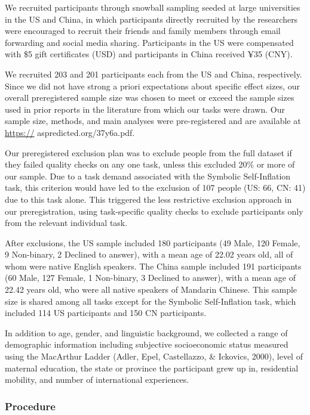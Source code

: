 \documentclass[
  man,floatsintext]{apa6}
\begin{document}
We recruited participants through snowball sampling seeded at large universities in the US and China, in which participants directly recruited by the researchers were encouraged to recruit their friends and family members through email forwarding and social media sharing. Participants in the US were compensated with \$5 gift certificates (USD) and participants in China received ¥35 (CNY).

We recruited 203 and 201 participants each from the US and China, respectively. Since we did not have strong a priori expectations about specific effect sizes, our overall preregistered sample size was chosen to meet or exceed the sample sizes used in prior reports in the literature from which our tasks were drawn. Our sample size, methods, and main analyses were pre-registered and are available at \url{https://} aspredicted.org/37y6a.pdf.

Our preregistered exclusion plan was to exclude people from the full dataset if they failed quality checks on any one task, unless this excluded 20\% or more of our sample. Due to a task demand associated with the Symbolic Self-Inflation task, this criterion would have led to the exclusion of 107 people (US: 66, CN: 41) due to this task alone. This triggered the less restrictive exclusion approach in our preregistration, using task-specific quality checks to exclude participants only from the relevant individual task.

After exclusions, the US sample included 180 participants (49 Male, 120 Female, 9 Non-binary, 2 Declined to answer), with a mean age of 22.02 years old, all of whom were native English speakers. The China sample included 191 participants (60 Male, 127 Female, 1 Non-binary, 3 Declined to answer), with a mean age of 22.42 years old, who were all native speakers of Mandarin Chinese. This sample size is shared among all tasks except for the Symbolic Self-Inflation task, which included 114 US participants and 150 CN participants.

In addition to age, gender, and linguistic background, we collected a range of demographic information including subjective socioeconomic status measured using the MacArthur Ladder (Adler, Epel, Castellazzo, \& Ickovics, 2000), level of maternal education, the state or province the participant grew up in, residential mobility, and number of international experiences.

\hypertarget{procedure}{%
\subsubsection{Procedure}\label{procedure}}
\end{document}
